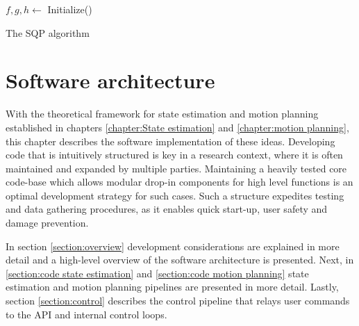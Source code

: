 \documentclass[times, utf8, diplomski, english]{fer}
\begin{document}
\begin{algorithm}[h]
 $f,g,h \leftarrow$ Initialize()
 \caption{The SQP algorithm}
 \label{algorithm:sqp}
\end{algorithm}










\chapter{Software architecture}
With the theoretical framework for state estimation and motion planning established in chapters \ref{chapter:State estimation} and \ref{chapter:motion planning}, this chapter describes the software implementation of these ideas.
Developing code that is intuitively structured is key in a research context, where it is often maintained and expanded by multiple parties.
Maintaining a heavily tested core code-base which allows modular drop-in components for high level functions is an optimal development strategy for such cases.
Such a structure expedites testing and data gathering procedures, as it enables quick start-up, user safety and damage prevention.

In section \ref{section:overview} development considerations are explained in more detail and a high-level overview of the software architecture is presented.
Next, in \ref{section:code state estimation} and \ref{section:code motion planning} state estimation and motion planning pipelines are presented in more detail.%
Lastly, section \ref{section:control} describes the control pipeline that relays user commands to the API and internal control loops. %
\end{document}
